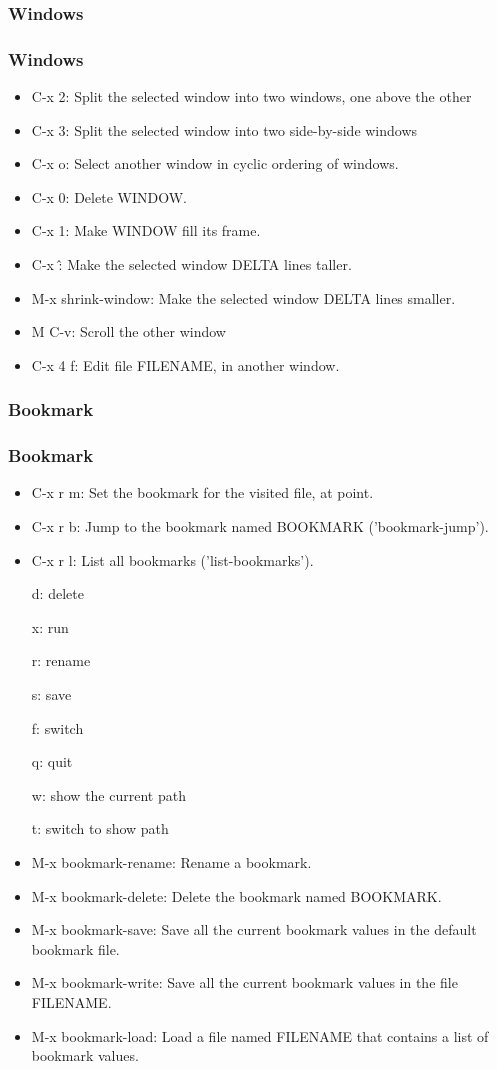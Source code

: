 \subsubsection{Windows}
\begin{frame}
\frametitle{Windows}
    \begin{itemize}
        \item C-x 2: Split the selected window into two windows, one above the other
        \item C-x 3: Split the selected window into two side-by-side windows
        \item C-x o: Select another window in cyclic ordering of windows.
        \item C-x 0: Delete WINDOW.
        \item C-x 1: Make WINDOW fill its frame.
        \item C-x \^: Make the selected window DELTA lines taller.
        \item M-x shrink-window: Make the selected window DELTA lines smaller.
        \item M C-v: Scroll the other window
        \item C-x 4 f: Edit file FILENAME, in another window.
    \end{itemize}
\end{frame}
\subsubsection{Bookmark}
\begin{frame}[allowframebreaks]
\frametitle{Bookmark}
    \begin{itemize}
        \item C-x r m: Set the bookmark for the visited file, at point.
        \item C-x r b: Jump to the bookmark named BOOKMARK ('bookmark-jump').
        \item C-x r l: List all bookmarks ('list-bookmarks').

  d: delete

  x: run

  r: rename

  s: save

  f: switch

  q: quit

  w: show the current path

  t: switch to show path

        \item M-x bookmark-rename: Rename a bookmark.
        \item M-x bookmark-delete: Delete the bookmark named BOOKMARK.
        \item M-x bookmark-save: Save all the current bookmark values in the default bookmark file.
        \item M-x bookmark-write: Save all the current bookmark values in the file FILENAME.
        \item M-x bookmark-load: Load a file named FILENAME that contains a list of bookmark values.
    \end{itemize}
\end{frame}

